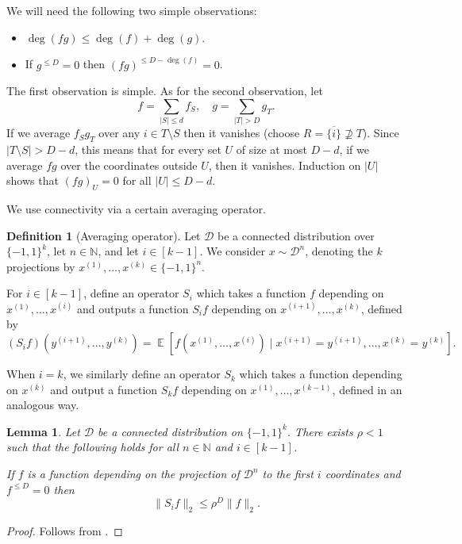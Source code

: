 \documentclass{article}
\newtheorem{lemma}[theorem]{Lemma}
\theoremstyle{definition}
\newtheorem{definition}[theorem]{Definition}
\theoremstyle{remark}
\DeclareMathOperator*{\E}{\mathbb{E}}
\renewcommand\leq{\leqslant}
\begin{document}
We will need the following two simple observations:
\begin{itemize}
    \item $\deg(fg) \leq \deg(f) + \deg(g)$.
    \item If $g^{\leq D} = 0$ then $(fg)^{\leq D - \deg(f)} = 0$.
\end{itemize}
The first observation is simple. As for the second observation, let
\[
 f = \sum_{|S| \leq d} f_S, \quad g = \sum_{|T|>D} g_T.
\]
If we average $f_S g_T$ over any $i \in T \setminus S$ then it vanishes (choose $R = \overline{\{i\}} \not\supseteq T$). Since $|T \setminus S| > D-d$, this means that for every set $U$ of size at most $D-d$, if we average $fg$ over the coordinates outside $U$, then it vanishes. Induction on $|U|$ shows that $(fg)_U = 0$ for all $|U| \leq D-d$.

\smallskip

We use connectivity via a certain averaging operator.

\begin{definition}[Averaging operator] \label{def:averaging}
Let $\mathcal{D}$ be a connected distribution over $\{-1,1\}^k$, let $n \in \mathbb{N}$, and let $i \in [k-1]$. We consider $x \sim \mathcal{D}^n$, denoting the $k$ projections by $x^{(1)},\ldots,x^{(k)} \in \{-1,1\}^n$.

For $i \in [k-1]$, define an operator $S_i$ which takes a function $f$ depending on $x^{(1)},\ldots,x^{(i)}$ and outputs a function $S_if$ depending on $x^{(i+1)},\ldots,x^{(k)}$, defined by
\[
 (S_if)(y^{(i+1)},\ldots,y^{(k)}) = \E[f(x^{(1)},\ldots,x^{(i)}) \mid x^{(i+1)}=y^{(i+1)},\ldots,x^{(k)}=y^{(k)}].
\]

When $i = k$, we similarly define an operator $S_k$ which takes a function depending on $x^{(k)}$ and output a function $S_kf$ depending on $x^{(1)},\ldots,x^{(k-1)}$, defined in an analogous way.
\end{definition}

\begin{lemma} \label{lem:averaging}
Let $\mathcal{D}$ be a connected distribution on $\{-1,1\}^k$. There exists $\rho < 1$ such that the following holds for all $n \in \mathbb{N}$ and $i \in [k-1]$.

If $f$ is a function depending on the projection of $\mathcal{D}^n$ to the first $i$ coordinates and
$f^{\leq D} = 0$ then \[ \|S_i f\|_2 \leq \rho^D \|f\|_2. \]
\end{lemma}
\begin{proof}
Follows from \cite[Propositions 2.11 and 2.12]{Mossel2010}.
\end{proof}
\end{document}
